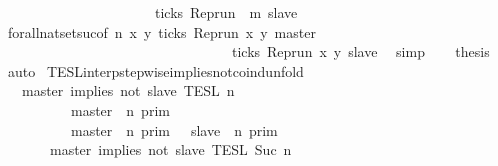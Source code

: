 \begin{isabellebody}
\ \ \ \ \ \ \ \ \ \ \ \ \ \ \ \ \ \ \ \ \ {\isasymlongrightarrow}\ ticks\ {\isacharparenleft}{\isacharparenleft}Rep{\isacharunderscore}run\ {\isasymrho}{\isacharparenright}\ m\ slave{\isacharparenright}{\isacharbraceright}{\isacartoucheclose}\isanewline
\ \ \ \ \isamarkupfalse%
\ forall{\isacharunderscore}nat{\isacharunderscore}set{\isacharunderscore}suc{\isacharbrackleft}of\ {\isacartoucheopen}n{\isacartoucheclose}\ {\isacartoucheopen}{\isasymlambda}x\ y{\isachardot}\ ticks\ {\isacharparenleft}{\isacharparenleft}Rep{\isacharunderscore}run\ x{\isacharparenright}\ y\ master{\isacharparenright}\isanewline
\ \ \ \ \ \ \ \ \ \ \ \ \ \ \ \ \ \ \ \ \ \ \ \ \ \ \ \ \ \ \ \ {\isasymlongrightarrow}\ ticks\ {\isacharparenleft}{\isacharparenleft}Rep{\isacharunderscore}run\ x{\isacharparenright}\ y\ slave{\isacharparenright}{\isacartoucheclose}{\isacharbrackright}\ \isamarkupfalse%
\ simp\isanewline
\ \ \isamarkupfalse%
\ {\isacharquery}thesis\ \isamarkupfalse%
\ auto\isanewline
{}\isamarkupfalse%
%
\endisatagproof
{\isafoldproof}%
%
\isadelimproof
\isanewline
%
\endisadelimproof
\isanewline
{}\isamarkupfalse%
\ TESL{\isacharunderscore}interp{\isacharunderscore}stepwise{\isacharunderscore}implies{\isacharunderscore}not{\isacharunderscore}coind{\isacharunderscore}unfold{\isacharcolon}\isanewline
\ \ {\isacartoucheopen}{\isasymlbrakk}\ master\ implies\ not\ slave\ {\isasymrbrakk}\isactrlsub T\isactrlsub E\isactrlsub S\isactrlsub L\isactrlbsup {\isasymge}\ n\isactrlesup \ {\isacharequal}\isanewline
\ \ \ \ \ {\isacharparenleft}\ \ \ \ {\isasymlbrakk}\ master\ {\isasymnot}{\isasymUp}\ n\ {\isasymrbrakk}\isactrlsub p\isactrlsub r\isactrlsub i\isactrlsub m\ \ \ \ \ \ \ \ \ \ \ \ \ \ \ \ \ \ \ \ \ \ \ %
\isanewline
\ \ \ \ \ \ \ \ {\isasymunion}\ {\isasymlbrakk}\ master\ {\isasymUp}\ n\ {\isasymrbrakk}\isactrlsub p\isactrlsub r\isactrlsub i\isactrlsub m\ {\isasyminter}\ {\isasymlbrakk}\ slave\ {\isasymnot}{\isasymUp}\ n\ {\isasymrbrakk}\isactrlsub p\isactrlsub r\isactrlsub i\isactrlsub m{\isacharparenright}\ \ %
\isanewline
\ \ \ \ \ {\isasyminter}\ {\isasymlbrakk}\ master\ implies\ not\ slave\ {\isasymrbrakk}\isactrlsub T\isactrlsub E\isactrlsub S\isactrlsub L\isactrlbsup {\isasymge}\ Suc\ n\isactrlesup {\isacartoucheclose}\isanewline
%
\isadelimproof
%
\endisadelimproof
%
\isatagproof
{}\isamarkupfalse%

\end{isabellebody}

